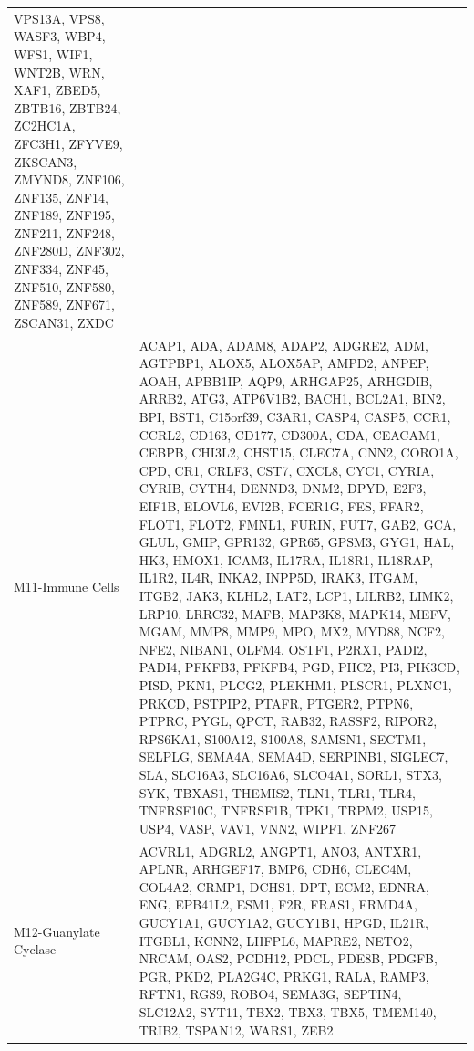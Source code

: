 \documentclass[
]{article}
\begin{document}
\begin{singlespace}
\begin{longtable}[t]{>{\raggedright\arraybackslash}p{1in}>{\raggedright\arraybackslash}p{5in}}
VPS13A, VPS8, WASF3, WBP4, WFS1, WIF1, WNT2B, WRN, XAF1, ZBED5, ZBTB16, ZBTB24, ZC2HC1A, ZFC3H1, ZFYVE9, ZKSCAN3, ZMYND8, ZNF106, ZNF135, ZNF14, ZNF189, ZNF195, ZNF211, ZNF248, ZNF280D, ZNF302, ZNF334, ZNF45, ZNF510, ZNF580, ZNF589, ZNF671, ZSCAN31, ZXDC\\
M11-Immune Cells & ACAP1, ADA, ADAM8, ADAP2, ADGRE2, ADM, AGTPBP1, ALOX5, ALOX5AP, AMPD2, ANPEP, AOAH, APBB1IP, AQP9, ARHGAP25, ARHGDIB, ARRB2, ATG3, ATP6V1B2, BACH1, BCL2A1, BIN2, BPI, BST1, C15orf39, C3AR1, CASP4, CASP5, CCR1, CCRL2, CD163, CD177, CD300A, CDA, CEACAM1, CEBPB, CHI3L2, CHST15, CLEC7A, CNN2, CORO1A, CPD, CR1, CRLF3, CST7, CXCL8, CYC1, CYRIA, CYRIB, CYTH4, DENND3, DNM2, DPYD, E2F3, EIF1B, ELOVL6, EVI2B, FCER1G, FES, FFAR2, FLOT1, FLOT2, FMNL1, FURIN, FUT7, GAB2, GCA, GLUL, GMIP, GPR132, GPR65, GPSM3, GYG1, HAL, HK3, HMOX1, ICAM3, IL17RA, IL18R1, IL18RAP, IL1R2, IL4R, INKA2, INPP5D, IRAK3, ITGAM, ITGB2, JAK3, KLHL2, LAT2, LCP1, LILRB2, LIMK2, LRP10, LRRC32, MAFB, MAP3K8, MAPK14, MEFV, MGAM, MMP8, MMP9, MPO, MX2, MYD88, NCF2, NFE2, NIBAN1, OLFM4, OSTF1, P2RX1, PADI2, PADI4, PFKFB3, PFKFB4, PGD, PHC2, PI3, PIK3CD, PISD, PKN1, PLCG2, PLEKHM1, PLSCR1, PLXNC1, PRKCD, PSTPIP2, PTAFR, PTGER2, PTPN6, PTPRC, PYGL, QPCT, RAB32, RASSF2, RIPOR2, RPS6KA1, S100A12, S100A8, SAMSN1, SECTM1, SELPLG, SEMA4A, SEMA4D, SERPINB1, SIGLEC7, SLA, SLC16A3, SLC16A6, SLCO4A1, SORL1, STX3, SYK, TBXAS1, THEMIS2, TLN1, TLR1, TLR4, TNFRSF10C, TNFRSF1B, TPK1, TRPM2, USP15, USP4, VASP, VAV1, VNN2, WIPF1, ZNF267\\
M12-Guanylate Cyclase & ACVRL1, ADGRL2, ANGPT1, ANO3, ANTXR1, APLNR, ARHGEF17, BMP6, CDH6, CLEC4M, COL4A2, CRMP1, DCHS1, DPT, ECM2, EDNRA, ENG, EPB41L2, ESM1, F2R, FRAS1, FRMD4A, GUCY1A1, GUCY1A2, GUCY1B1, HPGD, IL21R, ITGBL1, KCNN2, LHFPL6, MAPRE2, NETO2, NRCAM, OAS2, PCDH12, PDCL, PDE8B, PDGFB, PGR, PKD2, PLA2G4C, PRKG1, RALA, RAMP3, RFTN1, RGS9, ROBO4, SEMA3G, SEPTIN4, SLC12A2, SYT11, TBX2, TBX3, TBX5, TMEM140, TRIB2, TSPAN12, WARS1, ZEB2\\

\end{longtable}
\end{singlespace}
\end{document}
